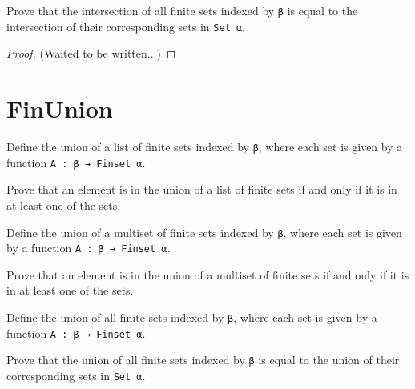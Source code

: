 \begin{lemma}\label{eq_FinInter₀}
  \leanok
  Prove that the intersection of all finite sets indexed by \verb|β| is equal to the intersection of their corresponding sets in \verb|Set α|.
\end{lemma}

\begin{proof}
  \leanok
  (Waited to be written...)
\end{proof}

\section{FinUnion}

\begin{definition}\label{List.FinUnion}
  \leanok
  Define the union of a list of finite sets indexed by \verb|β|, where each set is given by a function \verb|A : β → Finset α|.
\end{definition}

\begin{lemma}\label{List.eq_FinUnion}
  Prove that an element is in the union of a list of finite sets if and only if it is in at least one of the sets.
\end{lemma}

\begin{definition}\label{Multiset.FinUnion}
  Define the union of a multiset of finite sets indexed by \verb|β|, where each set is given by a function \verb|A : β → Finset α|.
\end{definition}

\begin{lemma}\label{Multiset.eq_FinUnion}
  Prove that an element is in the union of a multiset of finite sets if and only if it is in at least one of the sets.
\end{lemma}

\begin{definition}\label{FinUnion₀}
  Define the union of all finite sets indexed by \verb|β|, where each set is given by a function \verb|A : β → Finset α|.
\end{definition}

\begin{lemma}\label{eq_FinUnion₀}
  Prove that the union of all finite sets indexed by \verb|β| is equal to the union of their corresponding sets in \verb|Set α|.
\end{lemma}

